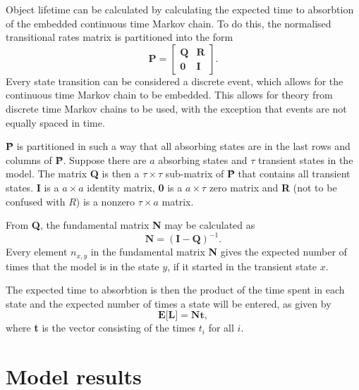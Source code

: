 \documentclass[10pt,a4paper,conference]{IEEEtran}
\begin{document}
Object lifetime can be calculated by calculating the expected time to absorbtion of the embedded continuous time Markov chain. To do this, the normalised transitional rates matrix is partitioned into the form
%
\begin{equation} \label{matrix_partition}
    \textbf{\^{P}} = \left[\begin{array}{c|c}
                   \textbf{Q} & \textbf{R} \\
                   \hline
                   \textbf{0} & \textbf{I}
                 \end{array}\right].
\end{equation}
%
Every state transition can be considered a discrete event, which allows for the continuous time Markov chain to be embedded. This allows for theory from discrete time Markov chains to be used, with the exception that events are not equally spaced in time.

\textbf{\^{P}} is partitioned in such a way that all absorbing states are in the last rows and columns of \textbf{\^{P}}. Suppose there are $a$ absorbing states and $\tau$ transient states in the model. The matrix \textbf{Q} is then a $\tau\times\tau$ sub-matrix of \textbf{\^{P}} that contains all transient states. \textbf{I} is a $a \times a$ identity matrix, \textbf{0} is a $a\times\tau$ zero matrix and \textbf{R} (not to be confused with $R$) is a nonzero $\tau\times a$ matrix.

From \textbf{Q}, the fundamental matrix \textbf{N} may be calculated as \cite{grinstead1997introduction_probability}
%
\begin{equation} \label{eq_fundamental_mat}
    \textbf{N} = (\textbf{I} - \textbf{Q})^{-1}.
\end{equation}
%
Every element $n_{x,y}$ in the fundamental matrix \textbf{N} gives the expected number of times that the model is in the state $y$, if it started in the transient state $x$.

The expected time to absorbtion is then the product of the time spent in each state and the expected number of times a state will be entered, as given by
%
\begin{equation} \label{expected_lifetime}
    \textbf{E[L]} = \textbf{Nt},
\end{equation}
%
where \textbf{t} is the vector consisting of the times $t_i$ for all $i$.

\section{Model results}
\label{results}
\end{document}
